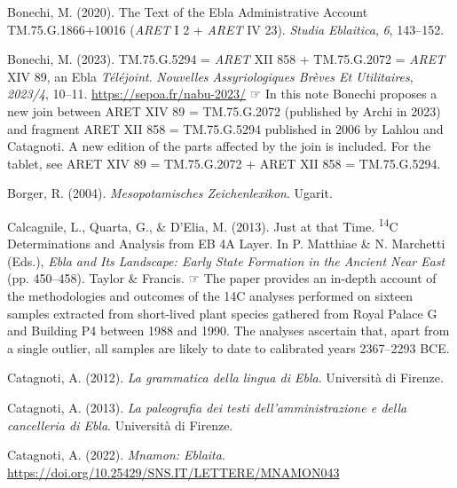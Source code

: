 \documentclass[
]{book}
\newlength{\cslhangindent}
\newlength{\cslentryspacingunit} %
\newenvironment{CSLReferences}[2] %
 {%
  \setlength{\parindent}{0pt}
  \ifodd #1
  \let\oldpar\par
  \def\par{\hangindent=\cslhangindent\oldpar}
  \fi
  \setlength{\parskip}{#2\cslentryspacingunit}
 }%
 {}
\newcommand{\CSLBlock}[1]{#1\hfill\break}
\begin{document}
\begin{CSLReferences}{1}{0}
\leavevmode{}%
Bonechi, M. (2020). The {Text} of the {Ebla Administrative Account TM}.75.{G}.1866+10016 ({\emph{ARET}} {I} 2 + {\emph{ARET}} {IV} 23). \emph{Studia Eblaitica}, \emph{6}, 143--152.

\leavevmode{}%
Bonechi, M. (2023). {TM}.75.{G}.5294 = {\emph{ARET}} {XII} 858 + {TM}.75.{G}.2072 = {\emph{ARET}} {XIV} 89, an {Ebla} {\emph{Téléjoint}}. \emph{Nouvelles Assyriologiques Brèves Et Utilitaires}, \emph{2023/4}, 10--11. \url{https://sepoa.fr/nabu-2023/}
\CSLBlock{\newline☞ In this note Bonechi proposes a new join between ARET XIV 89 = TM.75.G.2072 (published by Archi in 2023) and fragment ARET XII 858 = TM.75.G.5294 published in 2006 by Lahlou and Catagnoti. A new edition of the parts affected by the join is included. For the tablet, see ARET XIV 89 = TM.75.G.2072 + ARET XII 858 = TM.75.G.5294.}

\leavevmode{}%
Borger, R. (2004). \emph{Mesopotamisches Zeichenlexikon}. Ugarit.

\leavevmode{}%
Calcagnile, L., Quarta, G., \& D'Elia, M. (2013). Just at that {Time}. {\textsuperscript{14}}{C Determinations} and {Analysis} from {EB 4A Layer}. In P. Matthiae \& N. Marchetti (Eds.), \emph{Ebla and {Its Landscape}: {Early State Formation} in the {Ancient Near East}} (pp. 450--458). Taylor \& Francis.
\CSLBlock{\newline☞ The paper provides an in-depth account of the methodologies and outcomes of the 14C analyses performed on sixteen samples extracted from short-lived plant species gathered from Royal Palace G and Building P4 between 1988 and 1990. The analyses ascertain that, apart from a single outlier, all samples are likely to date to calibrated years 2367--2293 BCE.}

\leavevmode{}%
Catagnoti, A. (2012). \emph{La grammatica della lingua di Ebla}. Università di Firenze.

\leavevmode{}%
Catagnoti, A. (2013). \emph{La paleografia dei testi dell'amministrazione e della cancelleria di Ebla}. Università di Firenze.

\leavevmode{}%
Catagnoti, A. (2022). \emph{Mnamon: {Eblaita}}. \url{https://doi.org/10.25429/SNS.IT/LETTERE/MNAMON043}


\end{CSLReferences}
\end{document}
